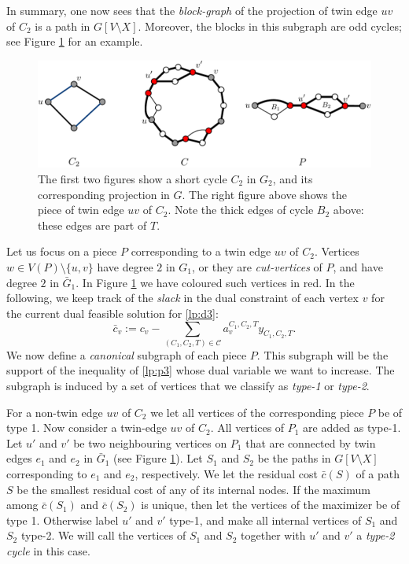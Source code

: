 \documentclass{article}
\newcommand{\C}{\ensuremath{\mathcal{C}}}
\newcommand{\0}{\mathbb{0}}
\newcommand{\1}{\mathbb{1}}
\begin{document}
In summary, one now sees that
the {\em block-graph} of the projection of twin edge $uv$ of $C_2$ is 
a path in $G[V\setminus X]$. Moreover, the
blocks in this subgraph are odd cycles; see Figure \ref{fig:cycG2} for
an example.

\begin{figure}[b]
  \begin{center}
    \includegraphics[width=.8\textwidth]{cycG2.pdf}
  \end{center}
  \caption{\label{fig:cycG2}The first two figures show a  short cycle $C_2$ in $G_2$, and its
    corresponding projection in $G$. The right figure above shows the piece
    of twin edge $uv$ of $C_2$. Note the thick edges of cycle $B_2$ above: these edges are
    part of $T$.}
\end{figure}

Let us focus on a piece $P$ corresponding to a twin edge $uv$ of
$C_2$. Vertices $w \in V(P)\setminus  \{u,v\}$ have degree $2$ in
$G_1$, or they are {\em cut-vertices} of $P$, and have degree $2$ in
$\bar{G}_1$. In Figure \ref{fig:cycG2} we have coloured such vertices
in red.
In the following, we keep track of the 
{\em slack} in the dual constraint of each vertex $v$ for the current dual feasible
solution for \eqref{lp:d3}:
\[ \bar{c}_v := c_v - \sum_{(C_1,C_2,T) \in \C} a^{C_1,C_2,T}_vy_{C_1,C_2,T}.\]
We now define a {\em canonical} subgraph of each piece $P$. 
This subgraph will be the support of the inequality of \eqref{lp:p3} whose dual variable
we want to increase. The subgraph is induced by a set of vertices 
that we classify as {\em type-1}  
or {\em type-2}. 

For a non-twin edge
$uv$ of $C_2$ we let all vertices of the corresponding piece $P$ be of type 1. 
Now consider a twin-edge $uv$ of $C_2$. All vertices of $P_1$ are added as type-1. 
Let $u'$ and $v'$ be two neighbouring vertices on $P_1$ that are connected by twin edges 
$e_1$ and $e_2$ in $\bar{G}_1$ (see Figure \ref{fig:cycG2}). 
Let $S_1$ and
$S_2$ be the paths in $G[V\setminus X]$ corresponding to $e_1$ and
$e_2$, respectively. We let the residual cost $\bar{c}(S)$ of a path $S$ be the
smallest residual cost of any of its internal nodes. 
If the maximum among $\bar{c}(S_1)$ and $\bar{c}(S_2)$ is unique, then let the vertices
of the maximizer be of type 1. Otherwise label $u'$ and $v'$ type-1, and make all internal
vertices of $S_1$ and $S_2$ type-2. We will call the vertices of $S_1$ and $S_2$ together
with $u'$ and $v'$ a {\em type-2 cycle} in this case.
\end{document}
